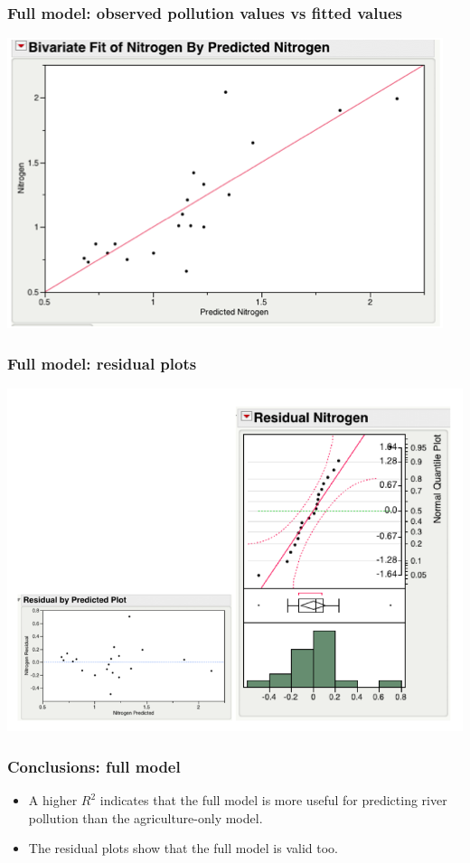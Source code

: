 \documentclass[handout]{beamer}\usepackage{graphicx, color}
\numberwithin{equation}{section}
\begin{document}
\begin{frame}
\frametitle{Full model: observed pollution values vs fitted values}
 \includegraphics{../../fig/riversfullmodelrealvsfit.png}
\end{frame}


\begin{frame}
\frametitle{Full model: residual plots}
 \includegraphics{../../fig/riversfullmodeldiag.png}
\end{frame}

\begin{frame}
\frametitle{Conclusions: full model}
\begin{itemize}
\pause \item A higher $R^2$ indicates that the full model is more useful for predicting river pollution than the agriculture-only model.
\pause \item The residual plots show that the full model is valid too.
\end{itemize}
\end{frame}
\end{document}
